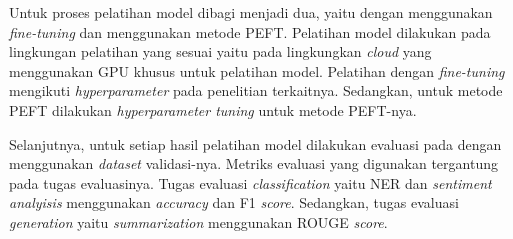 Untuk proses pelatihan model  dibagi menjadi dua, yaitu dengan menggunakan \textit{fine-tuning}  dan menggunakan metode PEFT. Pelatihan model  dilakukan pada lingkungan pelatihan yang sesuai yaitu pada lingkungkan \textit{cloud} yang menggunakan GPU khusus untuk pelatihan model. Pelatihan dengan \textit{fine-tuning}   mengikuti \textit{hyperparameter} pada penelitian terkaitnya. Sedangkan, untuk metode PEFT  dilakukan \textit{hyperparameter tuning} untuk metode PEFT-nya.

Selanjutnya, untuk setiap hasil pelatihan model  dilakukan evaluasi pada dengan menggunakan \textit{dataset} validasi-nya. Metriks evaluasi yang  digunakan tergantung pada tugas evaluasinya. Tugas evaluasi \textit{classification} yaitu NER dan \textit{sentiment analyisis}  menggunakan \textit{accuracy} dan F1 \textit{score}. Sedangkan, tugas evaluasi \textit{generation} yaitu \textit{summarization}  menggunakan ROUGE \textit{score}.

